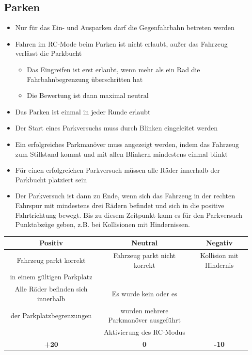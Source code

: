 \documentclass[a4paper, 11pt,usegeometry]{scrartcl}
\begin{document}
\subsection*{Parken}
\begin{itemize}
  \item Nur für das Ein- und Ausparken darf die Gegenfahrbahn betreten werden
  \item Fahren im RC-Mode beim Parken ist nicht erlaubt, außer das Fahrzeug verlässt die Parkbucht
  \begin{itemize}
    \item Das Eingreifen ist erst erlaubt, wenn mehr als ein Rad die Fahrbahnbegrenzung überschritten hat
    \item Die Bewertung ist dann maximal neutral
  \end{itemize}
  \item Das Parken ist einmal in jeder Runde erlaubt
  \item Der Start eines Parkversuchs muss durch Blinken eingeleitet werden
  \item Ein erfolgreiches Parkmanöver muss angezeigt werden, indem das Fahrzeug zum Stillstand kommt und mit allen Blinkern mindestens einmal blinkt
  \item Für einen erfolgreichen Parkversuch müssen alle Räder innerhalb der Parkbucht platziert sein
  \item Der Parkversuch ist dann zu Ende, wenn sich das Fahrzeug in der rechten Fahrspur mit mindestens drei Rädern befindet und sich in die positive Fahrtrichtung bewegt. Bis zu diesem Zeitpunkt kann es für den Parkversuch Punktabzüge geben, z.B. bei Kollisionen mit Hindernissen.
\end{itemize}

\begin{table}[H]
\begin{tabular}{|c|c|c|}
\hline
\rowcolor[HTML]{CACACA} 
\textbf{Positiv} & \textbf{Neutral} & \textbf{Negativ} \\ \hline
Fahrzeug parkt korrekt & Fahrzeug parkt nicht korrekt & Kollision mit Hindernis \\
in einem gültigen Parkplatz &  &  \\ \hline
Alle Räder befinden sich innerhalb & Es wurde kein oder es & \\
der Parkplatzbegrenzungen & wurden mehrere Parkmanöver ausgeführt & \\ \hline
& Aktivierung des RC-Modus & \\ \hline
\textbf{+20} & \textbf{0} & \textbf{-10} \\ \hline
\end{tabular}
\end{table}
\end{document}
